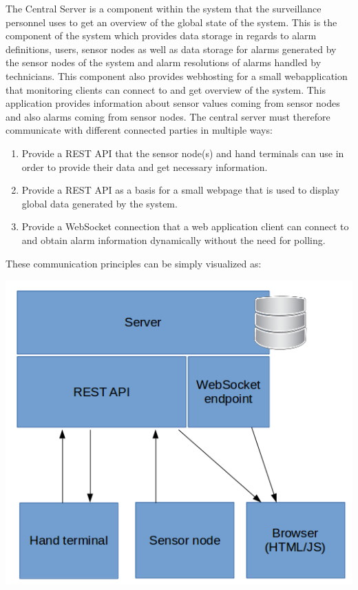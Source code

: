 The Central Server is a component within the system that the surveillance personnel uses to get an overview of the global state of the system. This is the component of the system which provides data storage in regards to alarm definitions, users, sensor nodes as well as data storage for alarms generated by the sensor nodes of the system and alarm resolutions of alarms handled by technicians. This component also provides webhosting for a small webapplication that monitoring clients can connect to and get overview of the system. This application provides information about sensor values coming from sensor nodes and also alarms coming from sensor nodes. The central server must therefore communicate with different connected parties in multiple ways: \newline
\begin{enumerate}
  \item Provide a REST API that the sensor node(s) and hand terminals can use in order to provide their data and get necessary information.
  \item Provide a REST API as a basis for a small webpage that is used to display global data generated by the system.
  \item Provide a WebSocket connection that a web application client can connect to and obtain alarm information dynamically without the need for polling.
\end{enumerate}

These communication principles can be simply visualized as:

\smallskip
\includegraphics[scale=0.6]{gfx/servercomm}
\smallskip

